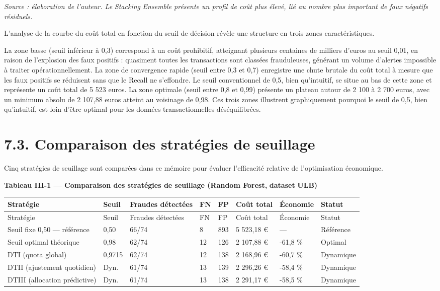 \emph{Source : élaboration de l'auteur. Le }\emph{Stacking}\emph{ Ensemble présente un profil de coût plus élevé, lié au nombre plus important de faux négatifs résiduels.}

L'analyse de la courbe du coût total en fonction du seuil de décision révèle une structure en trois zones caractéristiques.

La zone basse (seuil inférieur à 0,3) correspond à un coût prohibitif, atteignant plusieurs centaines de milliers d'euros au seuil 0,01, en raison de l'explosion des faux positifs : quasiment toutes les transactions sont classées frauduleuses, générant un volume d'alertes impossible à traiter opérationnellement. La zone de convergence rapide (seuil entre 0,3 et 0,7) enregistre une chute brutale du coût total à mesure que les faux positifs se réduisent sans que le Recall ne s'effondre. Le seuil conventionnel de 0,5, bien qu'intuitif, se situe au bas de cette zone et représente un coût total de 5 523 euros. La zone optimale (seuil entre 0,8 et 0,99) présente un plateau autour de 2 100 à 2 700 euros, avec un minimum absolu de 2 107,88 euros atteint au voisinage de 0,98. Ces trois zones illustrent graphiquement pourquoi le seuil de 0,5, bien qu'intuitif, est loin d'être optimal pour les données transactionnelles déséquilibrées.

\section{7.3. Comparaison des stratégies de seuillage}

Cinq stratégies de seuillage sont comparées dans ce mémoire pour évaluer l'efficacité relative de l'optimisation économique.

\textbf{Tableau III-1 — Comparaison des stratégies de seuillage (Random Forest, }\textbf{dataset}\textbf{ ULB)}

\begin{landscape}
\scriptsize
\begin{longtable}{|p{}|p{}|p{}|p{}|p{}|p{}|p{}|p{}|}
\hline
Stratégie & Seuil & Fraudes détectées & FN & FP & Coût total & Économie & Statut \\
\hline
\endfirsthead
\hline
Stratégie & Seuil & Fraudes détectées & FN & FP & Coût total & Économie & Statut \\
\hline
\endhead
Seuil fixe 0,50 — référence & 0,50 & 66/74 & 8 & 893 & 5 523,18 € & — & Référence \\
\hline
Seuil optimal théorique & 0,98 & 62/74 & 12 & 126 & 2 107,88 € & -61,8 \% & Optimal \\
\hline
DTI (quota global) & 0,9715 & 62/74 & 12 & 138 & 2 168,96 € & -60,7 \% & Dynamique \\
\hline
DTII (ajustement quotidien) & Dyn. & 61/74 & 13 & 139 & 2 296,26 € & -58,4 \% & Dynamique \\
\hline
DTIII (allocation prédictive) & Dyn. & 61/74 & 13 & 138 & 2 291,17 € & -58,5 \% & Dynamique \\
\hline
\end{longtable}
\normalsize
\end{landscape}

